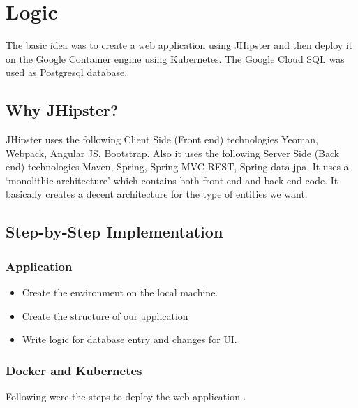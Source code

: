 \documentclass[a4paper]{article}
\begin{document}
\section{Logic}
The basic idea was to create a web application using JHipster and then deploy it on the Google Container engine using Kubernetes. The Google Cloud SQL was used as Postgresql database.

\subsection{Why JHipster?}
JHipster uses the following Client Side (Front end) technologies
Yeoman, Webpack, Angular JS, Bootstrap.
Also it uses the following Server Side (Back end) technologies
Maven, Spring, Spring MVC REST, Spring data jpa.
It uses a ‘monolithic architecture’ which contains both front-end and back-end code.
It basically creates a decent architecture for the type of entities we want.

\subsection{Step-by-Step Implementation}
\subsubsection{Application}
\begin{itemize}
\item Create the environment on the local machine.
\item Create the structure of our application
\item Write logic for database entry and changes for UI.
\end{itemize}

\subsubsection{Docker and Kubernetes}

Following were the steps to deploy the web application \cite{docker}\cite{kubernetes}.
\end{document}

